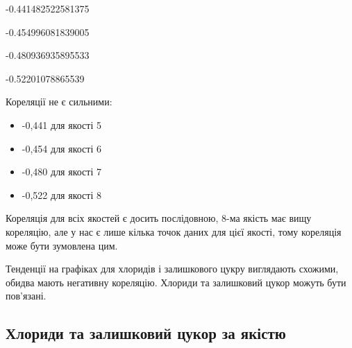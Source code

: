 \documentclass[
  letterpaper,
  DIV=11,
  numbers=noendperiod]{scrreprt}
\newenvironment{Shaded}{\begin{snugshade}}{\end{snugshade}}
\newcommand{\AttributeTok}[1]{\textcolor[rgb]{0.40,0.45,0.13}{#1}}
\newcommand{\FloatTok}[1]{\textcolor[rgb]{0.68,0.00,0.00}{#1}}
\newcommand{\FunctionTok}[1]{\textcolor[rgb]{0.28,0.35,0.67}{#1}}
\newcommand{\NormalTok}[1]{\textcolor[rgb]{0.00,0.23,0.31}{#1}}
\newcommand{\SpecialCharTok}[1]{\textcolor[rgb]{0.37,0.37,0.37}{#1}}
\newcommand{\StringTok}[1]{\textcolor[rgb]{0.13,0.47,0.30}{#1}}
\providecommand{\tightlist}{%
  \setlength{\itemsep}{0pt}\setlength{\parskip}{0pt}}\usepackage{longtable,booktabs,array}
\begin{document}
-0.441482522581375

-0.454996081839005

-0.480936935895533

-0.52201078865539

Кореляції не є сильними:

\begin{itemize}
\tightlist
\item
  -0,441 для якості 5
\item
  -0,454 для якості 6
\item
  -0,480 для якості 7
\item
  -0,522 для якості 8
\end{itemize}

Кореляція для всіх якостей є досить послідовною, 8-ма якість має вищу
кореляцію, але у нас є лише кілька точок даних для цієї якості, тому
кореляція може бути зумовлена цим.

Тенденції на графіках для хлоридів і залишкового цукру виглядають
схожими, обидва мають негативну кореляцію. Хлориди та залишковий цукор
можуть бути пов'язані.

\subsection{Хлориди та залишковий цукор за
якістю}\label{ux445ux43bux43eux440ux438ux434ux438-ux442ux430-ux437ux430ux43bux438ux448ux43aux43eux432ux438ux439-ux446ux443ux43aux43eux440-ux437ux430-ux44fux43aux456ux441ux442ux44e}

\begin{Shaded}
\end{Shaded}
\end{document}
